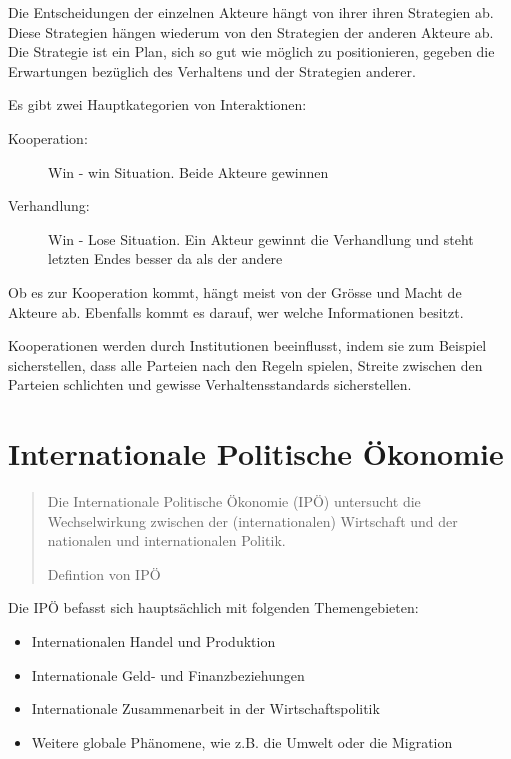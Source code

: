 \documentclass[a4paper, 11pt]{article}
\begin{document}
\vspace{10px}

\noindent Die Entscheidungen der einzelnen Akteure hängt von ihrer ihren Strategien ab. Diese Strategien hängen wiederum von den Strategien der anderen Akteure ab. \\

Die Strategie ist ein Plan, sich so gut wie möglich zu positionieren, gegeben die Erwartungen bezüglich des Verhaltens und der Strategien anderer.

\vspace{10px}

\noindent Es gibt zwei Hauptkategorien von Interaktionen:
\begin{description}
	\item[Kooperation: ] Win - win Situation. Beide Akteure gewinnen
	\item[Verhandlung: ] Win - Lose Situation. Ein Akteur gewinnt die Verhandlung und steht letzten Endes besser da als der andere
\end{description}

Ob es zur Kooperation kommt, hängt meist von der Grösse und Macht de Akteure ab. Ebenfalls kommt es darauf, wer welche Informationen besitzt.

Kooperationen werden durch Institutionen beeinflusst, indem sie zum Beispiel sicherstellen, dass alle Parteien nach den Regeln spielen, Streite zwischen den Parteien schlichten und gewisse Verhaltensstandards sicherstellen.

\section{Internationale Politische Ökonomie}

\begin{center}
	\blockquote[Defintion von IPÖ]{Die Internationale Politische Ökonomie (IPÖ) untersucht die Wechselwirkung zwischen der (internationalen) Wirtschaft und der nationalen und internationalen Politik. \\}
\end{center}

Die IPÖ befasst sich hauptsächlich mit folgenden Themengebieten:

\begin{itemize}
	\item Internationalen Handel und Produktion
	\item Internationale Geld- und Finanzbeziehungen
	\item Internationale Zusammenarbeit in der Wirtschaftspolitik
	\item Weitere globale Phänomene, wie z.B. die Umwelt oder die Migration
\end{itemize}
\end{document}
